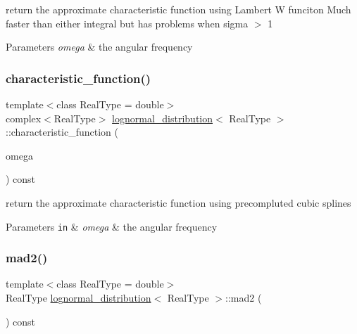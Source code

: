 return the approximate characteristic function using Lambert W funciton Much faster than either integral but has problems when sigma $>$ 1 


\begin{DoxyParams}{Parameters}
{\em omega} & the angular frequency \\
\hline
\end{DoxyParams}
\mbox{\label{structlognormal__distribution_ab1a396d60f24c820883c5e593ec39e79}} 
\subsubsection{\texorpdfstring{characteristic\+\_\+function()}{characteristic\_function()}}
{\footnotesize\ttfamily template$<$class Real\+Type  = double$>$ \\
complex$<$Real\+Type$>$ \mbox{\hyperlink{structlognormal__distribution}{lognormal\+\_\+distribution}}$<$ Real\+Type $>$\+::characteristic\+\_\+function (\begin{DoxyParamCaption}\item[{Real\+Type}]{omega }\end{DoxyParamCaption}) const\hspace{0.3cm}{\ttfamily [inline]}}



return the approximate characteristic function using precompluted cubic splines 


\begin{DoxyParams}[1]{Parameters}
\mbox{\tt in}  & {\em omega} & the angular frequency \\
\hline
\end{DoxyParams}
\mbox{\label{structlognormal__distribution_a41c93e0aac16e184161abc486a61319a}} 
\subsubsection{\texorpdfstring{mad2()}{mad2()}}
{\footnotesize\ttfamily template$<$class Real\+Type  = double$>$ \\
Real\+Type \mbox{\hyperlink{structlognormal__distribution}{lognormal\+\_\+distribution}}$<$ Real\+Type $>$\+::mad2 (\begin{DoxyParamCaption}{ }\end{DoxyParamCaption}) const\hspace{0.3cm}{\ttfamily [inline]}}



